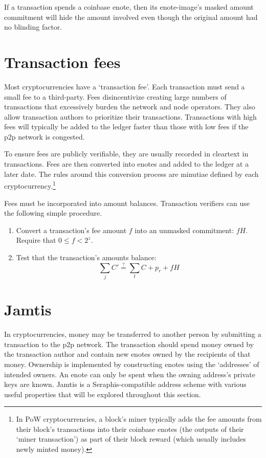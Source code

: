 If a transaction spends a coinbase enote, then its enote-image's masked amount commitment will hide the amount involved even though the original amount had no blinding factor.



\section{Transaction fees}
\label{sec:transaction-fees}

Most cryptocurrencies have a `transaction fee'. Each transaction must send a small fee to a third-party. Fees disincentivize creating large numbers of transactions that excessively burden the network and node operators. They also allow transaction authors to prioritize their transactions. Transactions with high fees will typically be added to the ledger faster than those with low fees if the p2p network is congested.

To ensure fees are publicly verifiable, they are usually recorded in cleartext in transactions. Fees are then converted into enotes and added to the ledger at a later date. The rules around this conversion process are minutiae defined by each cryptocurrency.\footnote{In PoW cryptocurrencies, a block's miner typically adds the fee amounts from their block's transactions into their coinbase enotes (the outputs of their `miner transaction') as part of their block reward (which usually includes newly minted money).}

Fees must be incorporated into amount balances. Transaction verifiers can use the following simple procedure.

\begin{enumerate}
    \item Convert a transaction's fee amount $f$ into an unmasked commitment: $f H$. Require that $0 \leq f < 2^z$.
    \item Test that the transaction's amounts balance:\vspace{.115cm}
    \[\sum_j C' \stackrel{?}{=} \sum_t C + p_r + f H\]
\end{enumerate}



\section{Jamtis}
\label{sec:jamtis}

In cryptocurrencies, money may be transferred to another person by submitting a transaction to the p2p network. The transaction should spend money owned by the transaction author and contain new enotes  owned by the recipients of that money. Ownership is implemented by constructing enotes using the `addresses' of intended owners. An enote can only be spent when the owning address's private keys are known. Jamtis \cite{jamtis} is a Seraphis-compatible address scheme with various useful properties that will be explored throughout this section.


